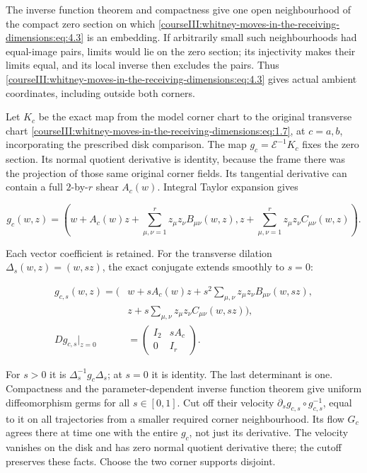 The inverse function theorem and compactness give one open neighbourhood of the compact zero section on which \eqref{courseIII:whitney-moves-in-the-receiving-dimensions:eq:4.3} is an embedding. If arbitrarily small such neighbourhoods had equal-image pairs, limits would lie on the zero section; its injectivity makes their limits equal, and its local inverse then excludes the pairs. Thus \eqref{courseIII:whitney-moves-in-the-receiving-dimensions:eq:4.3} gives actual ambient coordinates, including outside both corners.

Let \(K_c\) be the exact map from the model corner chart to the original transverse chart \eqref{courseIII:whitney-moves-in-the-receiving-dimensions:eq:1.7}, at \(c=a,b\), incorporating the prescribed disk comparison. The map \(g_c=\mathcal E^{-1}K_c\) fixes the zero section. Its normal quotient derivative is identity, because the frame there was the projection of those same original corner fields. Its tangential derivative can contain a full \(2\)-by-\(r\) shear \(A_c(w)\). Integral Taylor expansion gives

\begin{equation}
g_c(w,z)=
 \left(w+A_c(w)z+\sum_{\mu,\nu=1}^r z_\mu z_\nu B_{\mu\nu}(w,z),
       z+\sum_{\mu,\nu=1}^r z_\mu z_\nu C_{\mu\nu}(w,z)\right).
 \label{courseIII:whitney-moves-in-the-receiving-dimensions:eq:4.5}
\end{equation}

Each vector coefficient is retained. For the transverse dilation
\(\Delta_s(w,z)=(w,sz)\), the exact conjugate extends smoothly to \(s=0\):

\begin{equation}
\begin{aligned}
 g_{c,s}(w,z)=\bigg(&w+sA_c(w)z+
           s^2\sum_{\mu,\nu}z_\mu z_\nu B_{\mu\nu}(w,sz),\\
                  &z+s\sum_{\mu,\nu}z_\mu z_\nu C_{\mu\nu}(w,sz)\bigg),\\
 Dg_{c,s}|_{z=0}
   &=\begin{pmatrix}I_2&sA_c\\0&I_r\end{pmatrix}.
 \end{aligned}
 \label{courseIII:whitney-moves-in-the-receiving-dimensions:eq:4.6}
\end{equation}

For \(s>0\) it is \(\Delta_s^{-1}g_c\Delta_s\); at \(s=0\) it is identity. The last determinant is one. Compactness and the parameter-dependent inverse function theorem give uniform diffeomorphism germs for all \(s\in[0,1]\). Cut off their velocity \(\partial_s g_{c,s}\circ g_{c,s}^{-1}\), equal to it on all trajectories from a smaller required corner neighbourhood. Its flow \(G_c\) agrees there at time one with the entire \(g_c\), not just its derivative. The velocity vanishes on the disk and has zero normal quotient derivative there; the cutoff preserves these facts. Choose the two corner supports disjoint.


